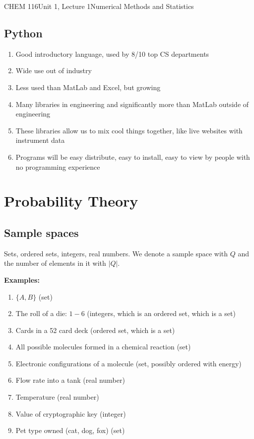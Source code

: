 \documentclass{article}
\renewcommand{\headrulewidth}{0.0pt}
\begin{document}
\begin{tdoc}{CHEM 116}{Unit 1, Lecture 1}{Numerical Methods and Statistics}
\subsection{Python}

\begin{enumerate}

\item Good introductory language, used by 8/10 top CS departments
\item Wide use out of industry
\item Less used than MatLab and Excel, but growing
\item Many libraries in engineering and significantly more than MatLab outside of engineering
\item These libraries allow us to mix cool things together, like live websites with instrument data
\item Programs will be easy distribute, easy to install, easy to view by people with no programming experience

\end{enumerate}

\renewcommand{\headrulewidth}{0.4pt}

\section{Probability Theory}

\subsection{Sample spaces}

Sets, ordered sets, integers, real numbers. We denote a sample space
with $Q$ and the number of elements in it with $|Q|$.

{\bf Examples:}
\begin{enumerate}

\item $\{A, B\}$ (set)
\item The roll of a die: $1-6$ (integers, which is an ordered set, which is a set)
\item Cards in a 52 card deck (ordered set, which is a set)
\item All possible molecules formed in a chemical reaction (set)
\item Electronic configurations of a molecule (set, possibly ordered with energy)
\item Flow rate into a tank (real number)
\item Temperature (real number)
\item Value of cryptographic key (integer)
\item Pet type owned (cat, dog, fox) (set)


\end{enumerate}
\end{tdoc}
\end{document}
